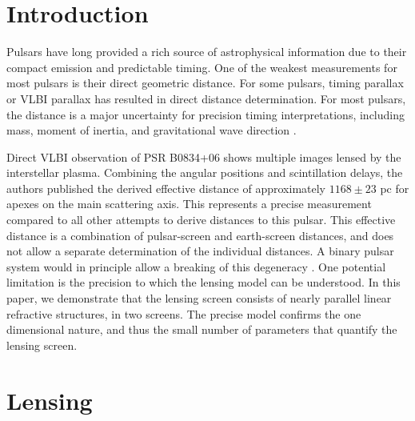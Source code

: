 \documentclass[useAMS,usenatbib]{mn2e}
\begin{document}
\newcommand{\be}{\begin{eqnarray}}
\newcommand{\ee}{\end{eqnarray}}
\newcommand{\beq}{\begin{equation}}
\newcommand{\eeq}{\end{equation}}

\section{Introduction}

Pulsars have long provided a rich source of astrophysical information
due to their compact emission and predictable timing. One of the
weakest measurements for most pulsars is their direct geometric
distance.  For some pulsars, timing parallax or VLBI parallax has
resulted in direct distance determination.  For most pulsars, the
distance is a major uncertainty for precision timing interpretations,
including mass, moment of inertia\citep{2006Sci...314...97K,2012hpa..book.....L}, and
gravitational wave direction \citep{boyle2012}.

Direct VLBI observation of PSR B0834+06 shows multiple images lensed
by the interstellar plasma.  Combining the angular positions and
scintillation delays, the authors published the derived effective
distance \citep{2010ApJ...708..232B} of approximately $1168\pm 23$ pc
for apexes on the main scattering axis.
This represents a precise
measurement compared to all other attempts to derive distances to this
pulsar.  This effective distance is a combination of pulsar-screen and
earth-screen distances, and does not allow a separate determination of
the individual distances.  A binary pulsar system would in principle
allow a breaking of this degeneracy \citep{2014MNRAS.442.3338P}. One
potential limitation is the precision to which the lensing model can
be understood.  In this paper, we demonstrate that the lensing screen
consists of nearly parallel linear refractive structures, in two
screens.  The precise model confirms the one dimensional nature, and
thus the small number of parameters that
quantify the lensing screen. 

\section{Lensing}
\end{document}
